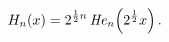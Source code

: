 \[\mathop{H_{n}\/}\nolimits\!\left(x\right)=2^{\frac{1}{2}n}\mathop{\mathit{He}_%
{n}\/}\nolimits\!\left(2^{\frac{1}{2}}x\right).\]